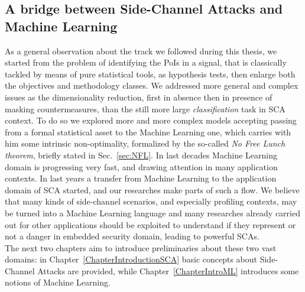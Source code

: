 \subsection{A bridge between Side-Channel Attacks and Machine Learning}
As a general observation about the track we followed during this thesis, we started from the problem of identifying the PoIs in a signal, that is classically tackled by means of pure statistical tools, as hypothesis tests,  then enlarge both the objectives and methodology classes. We addressed more general and complex issues as the dimensionality reduction, first in absence then in presence of masking countermeasures, than the still more large \emph{classification} task in SCA context. To do so we explored more and more complex models accepting passing from a formal statistical asset to the Machine Learning one, which carries with him some intrinsic non-optimality, formalized by the so-called \emph{No Free Lunch theorem}, briefly stated in Sec.~\ref{sec:NFL}. In last decades Machine Learning domain is progressing very fast, and drawing attention in many application contexts. In last years a transfer from Machine Learning to the application domain of SCA started, and our researches make parts of such a flow. We believe that many kinds of side-channel scenarios, and especially profiling contexts, may be turned into a Machine Learning language and many researches already carried out for other applications should be exploited to understand if they represent or not a danger in embedded security domain, leading to powerful SCAs. \\

The next two chapters aim to introduce preliminaries about these two vast domains: in Chapter~\ref{ChapterIntroductionSCA} basic concepts about Side-Channel Attacks are provided, while Chapter~\ref{ChapterIntroML} introduces some notions of Machine Learning.
